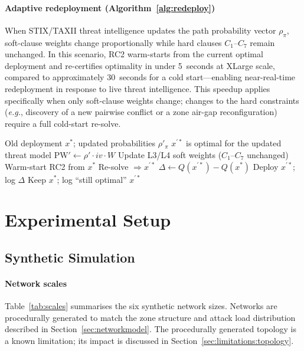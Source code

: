 \documentclass[journal]{IEEEtran}
\newcommand{\eg}{\emph{e.g.}}
\begin{document}
\paragraph{Adaptive redeployment (Algorithm~\ref{alg:redeploy})}
When STIX/TAXII threat intelligence updates the path probability
vector $\rho_\pi$, soft-clause weights change proportionally while
hard clauses $C_1$--$C_7$ remain unchanged. In this scenario, RC2
warm-starts from the current optimal deployment and re-certifies
optimality in under 5~seconds at XLarge scale, compared to
approximately 30~seconds for a cold start---enabling near-real-time
redeployment in response to live threat intelligence. This speedup
applies specifically when only soft-clause weights change; changes
to the hard constraints (\eg, discovery of a new pairwise conflict
or a zone air-gap reconfiguration) require a full cold-start
re-solve.

\begin{algorithm}
\caption{Adaptive Redeployment on Updated Threat Priors}
\label{alg:redeploy}
\begin{algorithmic}[1]
\REQUIRE Old deployment $x^*$; updated probabilities $\rho'_\pi$
\ENSURE $x^{\prime*}$ is optimal for the updated threat model
\STATE $\mathrm{PW}'\leftarrow\rho'\cdot iv\cdot W$
\STATE Update L3/L4 soft weights ($C_1$--$C_7$ unchanged)
\STATE Warm-start RC2 from $x^*$
\STATE Re-solve $\Rightarrow x^{\prime*}$
\STATE $\Delta\leftarrow Q(x^{\prime*})-Q(x^*)$
  \STATE Deploy $x^{\prime*}$; log $\Delta$
\ELSE
  \STATE Keep $x^*$; log ``still optimal''
\ENDIF
\RETURN $x^{\prime*}$
\end{algorithmic}
\end{algorithm}

\section{Experimental Setup}
\label{sec:eval}

\subsection{Synthetic Simulation}
\label{sec:eval:sim}

\paragraph{Network scales}
Table~\ref{tab:scales} summarises the six synthetic network sizes.
Networks are procedurally generated to match the zone structure and
attack load distribution described in Section~\ref{sec:networkmodel}.
The procedurally generated topology is a known limitation; its
impact is discussed in Section~\ref{sec:limitations:topology}.
\end{document}
